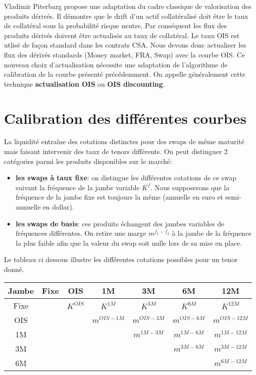 \documentclass{article}
\begin{document}
Vladimir Piterbarg propose une adaptation du cadre classique de valorisation des produits dérivés. Il démontre que le drift d’un actif collatéralisé doit être le taux de collatéral sous la probabilité risque neutre. Par conséquent les flux des produits dérivés doivent être actualisés au taux de collatéral. Le taux OIS est utlisé de façon standard dans les contrats CSA. Nous devons donc actualiser les flux des dérivés standards (Money market, FRA, Swap) avec la courbe OIS. Ce nouveau choix d'actualisation nécessite une adaptation de l'algorithme de calibration de la courbe présenté précédemment. On appelle généralement cette technique \textbf{actualisation OIS} ou \textbf{OIS discounting}.\\

\section*{Calibration des différentes courbes}

La liquidité entraîne des cotations distinctes pour des swaps de même maturité mais faisant intervenir des taux de tenors différents. On peut distinguer 2 catégories parmi les produits disponibles sur le marché:\\
\begin{itemize}
\item \textbf{les swaps à taux fixe}: on distingue les différentes cotations de ce swap suivant la fréquence de la jambe variable $K^f$. Nous supposerons que la fréquence de la jambe fixe est toujours la même (annuelle en euro et semi-annuelle en dollar).\\

\item \textbf{les swaps de basis}: ces produits échangent des jambes variables de fréquences différentes. On retire une marge $m^{f_1-f_2}$ à la jambe de la fréquence la plus faible afin que la valeur du swap soit nulle lors de sa mise en place.\\ 

\end{itemize}

Le tableau ci dessous illustre les différentes cotations possibles pour un tenor donné.

\begin{center}
\begin{tabular}{|c|c|c|c|c|c|c|}
\hline
Jambe&Fixe&OIS&1M&3M&6M&12M\\
\hline
Fixe&&$K^{OIS}$&$K^{1M}$&$K^{3M}$&$K^{6M}$&$K^{12M}$\\
OIS&&&$m^{OIS-1M}$&$m^{OIS-3M}$&$m^{OIS-6M}$&$m^{OIS-12M}$\\
1M&&&&$m^{1M-3M}$&$m^{1M-6M}$&$m^{1M-12M}$\\
3M&&&&&$m^{3M-6M}$&$m^{3M-12M}$\\
6M&&&&&&$m^{6M-12M}$\\
\hline
\end{tabular}
\end{center}
\end{document}
